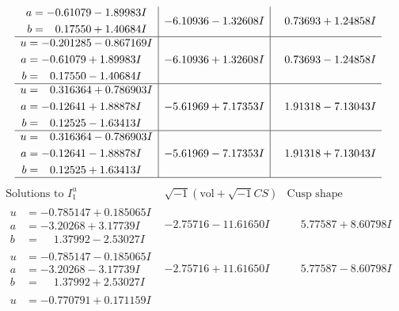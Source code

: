 \documentclass[1p]{elsarticle_modified}
\theoremstyle{definition}
\newcommand{\I}{\sqrt{-1}}
\begin{document}
$$\begin{array}{c|c|c}
\begin{aligned}
a &= -0.61079 - 1.89983 I \\
b &= \phantom{-}0.17550 + 1.40684 I\end{aligned}
 & -6.10936 - 1.32608 I & \phantom{-}0.73693 + 1.24858 I \\ \hline\begin{aligned}
u &= -0.201285 - 0.867169 I \\
a &= -0.61079 + 1.89983 I \\
b &= \phantom{-}0.17550 - 1.40684 I\end{aligned}
 & -6.10936 + 1.32608 I & \phantom{-}0.73693 - 1.24858 I \\ \hline\begin{aligned}
u &= \phantom{-}0.316364 + 0.786903 I \\
a &= -0.12641 + 1.88878 I \\
b &= \phantom{-}0.12525 - 1.63413 I\end{aligned}
 & -5.61969 + 7.17353 I & \phantom{-}1.91318 - 7.13043 I \\ \hline\begin{aligned}
u &= \phantom{-}0.316364 - 0.786903 I \\
a &= -0.12641 - 1.88878 I \\
b &= \phantom{-}0.12525 + 1.63413 I\end{aligned}
 & -5.61969 - 7.17353 I & \phantom{-}1.91318 + 7.13043 I\\
 \hline 
 \end{array}$$\newpage$$\begin{array}{c|c|c}  
\text{Solutions to }I^u_{1}& \I (\text{vol} + \sqrt{-1}CS) & \text{Cusp shape}\\
 \hline 
\begin{aligned}
u &= -0.785147 + 0.185065 I \\
a &= -3.20268 + 3.17739 I \\
b &= \phantom{-}1.37992 - 2.53027 I\end{aligned}
 & -2.75716 - 11.61650 I & \phantom{-}5.77587 + 8.60798 I \\ \hline\begin{aligned}
u &= -0.785147 - 0.185065 I \\
a &= -3.20268 - 3.17739 I \\
b &= \phantom{-}1.37992 + 2.53027 I\end{aligned}
 & -2.75716 + 11.61650 I & \phantom{-}5.77587 - 8.60798 I \\ \hline\begin{aligned}
u &= -0.770791 + 0.171159 I \\

\end{aligned}
\end{array}$$
\end{document}

